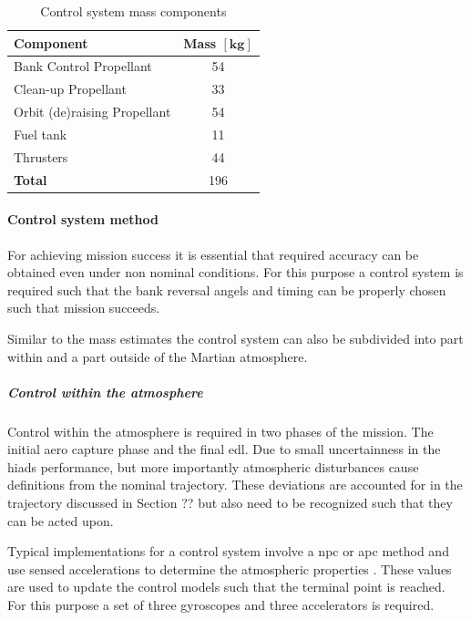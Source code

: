 \begin{table}[h]
\centering
\caption{Control system mass components}
\label{tab:controlmassbreakdown}
\begin{tabular}{|l|c|} \hline
\textbf{Component}                 & \textbf{Mass $\mathbf{[kg]}$} \\ \hline \hline
Bank Control Propellant      &     54       \\ \hline
Clean-up Propellant          &     33       \\ \hline
Orbit (de)raising Propellant &     54       \\ \hline
Fuel tank              		 &     11      \\ \hline
Thrusters                	 &     44     \\ \hline \hline
\textbf{Total}               &     196      \\ \hline
\end{tabular}
\end{table}

\paragraph{Control system method}

For achieving mission success it is essential that required accuracy can be obtained even under non nominal conditions. For this purpose a control system is required such that the bank reversal angels and timing can be properly chosen such that mission succeeds.

Similar to the mass estimates the control system can  also be subdivided into part within and a part outside of the Martian atmosphere.

\subparagraph{Control within the atmosphere}

Control within the atmosphere is required in two phases of the mission. The initial aero capture phase and the final \gls{edl}. Due to small uncertainness in the \glspl{hiad} performance, but more importantly atmospheric disturbances cause definitions from the nominal trajectory. These deviations are accounted for in the trajectory discussed in Section ?? but also need to be recognized such that they can be acted upon. 

Typical implementations for a control system involve a \gls{npc} or \gls{apc} method and use sensed accelerations to determine the atmospheric properties \cite{Davis2010}. These values are used to update the control models such that the terminal point is reached. For this purpose a set of three gyroscopes and three accelerators is required. 

